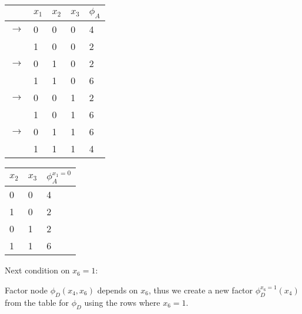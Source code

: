 \begin{exenumerate}
\begin{solution}
    \begin{center}
      \begin{tabular}{lllll}
        \toprule
        & $x_1$ & $x_2$ & $x_3$ & $\phi_A$\\
        \midrule
        $\rightarrow$ & 0 & 0 & 0 & 4 \\
                      & 1 & 0 & 0 & 2 \\
        $\rightarrow$ & 0 & 1 & 0 & 2 \\
                      & 1 & 1 & 0 & 6 \\
        $\rightarrow$ & 0 & 0 & 1 & 2 \\
                      & 1 & 0 & 1 & 6 \\
        $\rightarrow$ & 0 & 1 & 1 & 6 \\
                      & 1 & 1 & 1 & 4 \\
        \bottomrule
      \end{tabular}
      \hspace{3ex}  \hspace{3ex}
      \begin{tabular}{lll}
        \toprule
        $x_2$ & $x_3$ & $\phi_A^{x_1=0}$\\
        \midrule
        0 & 0 & 4 \\
        1 & 0 & 2 \\
        0 & 1 & 2 \\
        1 & 1 & 6 \\
        \bottomrule
      \end{tabular}
    \end{center}

    Next condition on $x_6 = 1$:

    Factor node $\phi_D(x_4, x_6)$ depends on $x_6$, thus we create a new factor $\phi_D^{x_6=1}(x_4)$ from the table for $\phi_D$ using the rows where $x_6 = 1$.

    \begin{center}
\end{center}
\end{solution}
\end{exenumerate}
